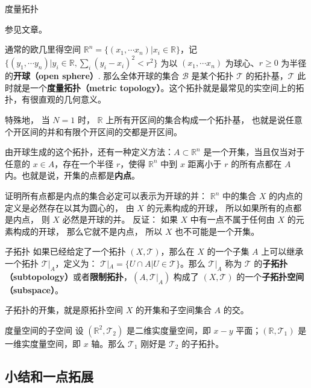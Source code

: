 \begin{example}{度量拓扑}

参见文章。

通常的欧几里得空间 $\mathbb{R}^n=\{(x_1, \cdots x_n)|x_i\in \mathbb{R}\}$，记 $\{(y_1, \cdots y_n)|y_i\in \mathbb{R}, \sum_i(y_i-x_i)^2< r^2\}$ 为以 $(x_1, \cdots x_n)$ 为球心、$r\geqslant 0$ 为半径的\textbf{开球（open sphere）}. 那么全体开球的集合 $\mathcal{B}$ 是某个拓扑 $\mathcal{T}$ 的拓扑基，$\mathcal{T}$ 此时就是一个\textbf{度量拓扑（metric topology）}。这个拓扑就是最常见的实空间上的拓扑，有很直观的几何意义。

特殊地， 当 $N = 1$ 时， $\mathbb R$ 上所有开区间的集合构成一个拓扑基， 也就是说任意个开区间的并和有限个开区间的交都是开区间。

由开球生成的这个拓扑，还有一种定义方法：$A\subset \mathbb{R}^n$ 是一个开集，当且仅当对于任意的 $x\in A$，存在一个半径 $r$，使得 $\mathbb R^n$ 中到 $x$ 距离小于 $r$ 的所有点都在 $A$ 内。也就是说，开集的点都是\textbf{内点}。

证明所有点都是内点的集合必定可以表示为开球的并： $\mathbb R^n$ 中的集合 $X$ 的内点的定义是必然存在以其为圆心的， 由 $X$ 的元素构成的开球， 所以如果所有的点都是内点， 则 $X$ 必然是开球的并。 反证： 如果 $X$ 中有一点不属于任何由 $X$ 的元素构成的开球， 那么它就不是内点， 所以 $X$ 也不可能是一个开集。
\end{example}

\begin{definition}{子拓扑}\label{def_Topol_3}
如果已经给定了一个拓扑 $(X, \mathcal{T})$，那么在 $X$ 的一个子集 $A$ 上可以继承一个拓扑 $\mathcal{T}|_A$，定义为：
$\mathcal{T}|_A=\{U\cap A|U\in \mathcal{T}\}$。那么 $\mathcal{T}|_A$ 称为 $\mathcal{T}$ 的\textbf{子拓扑（subtopology）}或者\textbf{限制拓扑}，$(A, \mathcal{T}|_A)$ 构成了 $(X, \mathcal{T})$ 的一个\textbf{子拓扑空间（subspace）}。
\end{definition}

子拓扑的开集，就是原拓扑空间 $X$ 的开集和子空间集合 $A$ 的交。

\begin{example}{度量空间的子空间}
设 $(\mathbb{R}^2, \mathcal{T}_2)$ 是二维实度量空间，即 $x-y$ 平面；$(\mathbb{R}, \mathcal{T}_1)$ 是一维实度量空间，即 $x$ 轴。那么 $\mathcal{T}_1$ 刚好是 $\mathcal{T}_2$ 的子拓扑。
\end{example}

\subsection{小结和一点拓展}\label{sub_Topol_1}

